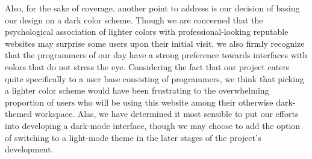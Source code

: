 \documentclass[a4paper, 12pt]{article}
\begin{document}
    Also, for the sake of coverage, another point to address is our decision of basing our design on a dark color scheme. Though we are concerned that the psychological association of
    lighter colors with professional-looking reputable websites may surprise some users upon their initial visit, we also firmly recognize that the programmers
    of our day have a strong preference towards interfaces with colors that do not stress the eye. Considering the fact that our project caters quite specifically to
    a user base consisting of programmers, we think that picking a lighter color scheme would have been frustrating to the overwhelming proportion of users who will
    be 
    using this website among their otherwise dark-themed workspace. 
    Alas, we have determined it most sensible to put our efforts into developing a dark-mode interface, though we may choose to add the option of switching
    to a light-mode theme in the later stages of the project's development.

    \pagebreak
    \printbibliography
\end{document}
